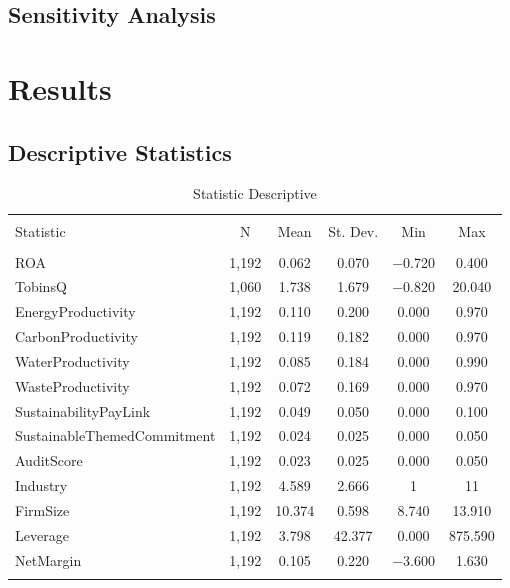 \documentclass[12pt,]{article}
\begin{document}
\newpage

\subsection{Sensitivity Analysis}\label{sensitivity-analysis}

\FloatBarrier
\newpage
{}

\section{Results}\label{results}

\subsection{Descriptive Statistics}\label{descriptive-statistics}

\begin{table}[!htbp] \centering 
  \caption{Statistic Descriptive} 
  \label{StatDes} 
\begin{tabular}{@{\extracolsep{5pt}}lccccc} 
\\[-1.8ex]\hline 
\hline \\[-1.8ex] 
Statistic & \multicolumn{1}{c}{N} & \multicolumn{1}{c}{Mean} & \multicolumn{1}{c}{St. Dev.} & \multicolumn{1}{c}{Min} & \multicolumn{1}{c}{Max} \\ 
\hline \\[-1.8ex] 
ROA & 1,192 & 0.062 & 0.070 & $-$0.720 & 0.400 \\ 
TobinsQ & 1,060 & 1.738 & 1.679 & $-$0.820 & 20.040 \\ 
EnergyProductivity & 1,192 & 0.110 & 0.200 & 0.000 & 0.970 \\ 
CarbonProductivity & 1,192 & 0.119 & 0.182 & 0.000 & 0.970 \\ 
WaterProductivity & 1,192 & 0.085 & 0.184 & 0.000 & 0.990 \\ 
WasteProductivity & 1,192 & 0.072 & 0.169 & 0.000 & 0.970 \\ 
SustainabilityPayLink & 1,192 & 0.049 & 0.050 & 0.000 & 0.100 \\ 
SustainableThemedCommitment & 1,192 & 0.024 & 0.025 & 0.000 & 0.050 \\ 
AuditScore & 1,192 & 0.023 & 0.025 & 0.000 & 0.050 \\ 
Industry & 1,192 & 4.589 & 2.666 & 1 & 11 \\ 
FirmSize & 1,192 & 10.374 & 0.598 & 8.740 & 13.910 \\ 
Leverage & 1,192 & 3.798 & 42.377 & 0.000 & 875.590 \\ 
NetMargin & 1,192 & 0.105 & 0.220 & $-$3.600 & 1.630 \\ 
\hline \\[-1.8ex] 
\end{tabular} 
\end{table}
\end{document}
